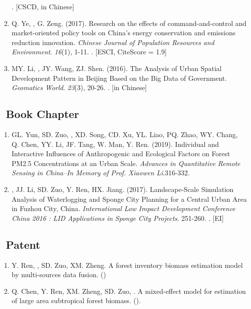 \begin{enumerate}
    . [CSCD, in Chinese]
\item
    Q. Ye, \Shaoqing, G. Zeng. (2017).
	Research on the effects of command-and-control and market-oriented policy tools on China’s energy conservation and emissions reduction innovation.
    \textit{Chinese Journal of Population Resources and Environment}. \textit{16}(1), 1-11.
    . [ESCI, CiteScore = 1.9]
\item
    MY. Li, \Shaoqing, JY. Wang, ZJ. Shen. (2016).
	The Analysis of Urban Spatial Development Pattern in Beijing Based on the Big Data of Government.
    \textit{Geomatics World}. \textit{23}(3), 20-26.
    . [in Chinese]
\end{enumerate}

\subsection*{\texorpdfstring{\faBook\ Book Chapter}{Book Chapter}}
\begin{enumerate}
\item
    GL. Yun, SD. Zuo, \Shaoqing, XD. Song, CD. Xu, YL. Liao, PQ. Zhao, WY. Chang, Q. Chen, YY. Li, JF. Tang, W. Man, Y. Ren. (2019).
	Individual and Interactive Influences of Anthropogenic and Ecological Factors on Forest PM2.5 Concentrations at an Urban Scale.
    \textit{Advances in Quantitative Remote Sensing in China–In Memory of Prof. Xiaowen Li}.316-332.
\item
    \Shaoqing, JJ. Li, SD. Zuo, Y. Ren, HX. Jiang. (2017).
	Landscape-Scale Simulation Analysis of Waterlogging and Sponge City Planning for a Central Urban Area in Fuzhou City, China.
    \textit{International Low Impact Development Conference China 2016 : LID Applications in Sponge City Projects}. 251-260.
    . [EI]
\end{enumerate}

\subsection*{\texorpdfstring{\faBook\ Patent}{Patent}}
\begin{enumerate}
\item
     Y. Ren, \Shaoqing, SD. Zuo, XM. Zheng.
     A forest inventory biomass estimation model by multi-sources data fusion.
     (\Review)
\item
     Q. Chen, Y. Ren, XM. Zheng, SD. Zuo, \Shaoqing.
     A mixed-effect model for estimation of large area subtropical forest biomass.
     (\Review).
\end{enumerate}

